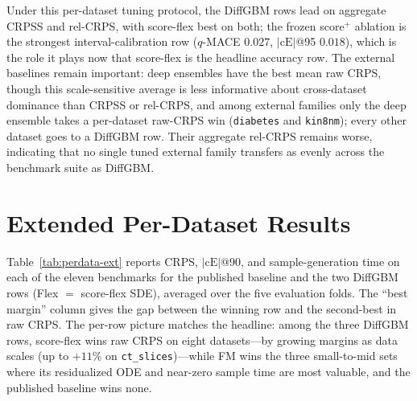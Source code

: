 \documentclass{article}
\begin{document}
Under this per-dataset tuning protocol, the DiffGBM rows lead on aggregate CRPSS and rel-CRPS, with score-flex best on both; the frozen score$^+$ ablation is the strongest interval-calibration row ($q$-MACE $0.027$, $|\text{cE}|$@95 $0.018$), which is the role it plays now that score-flex is the headline accuracy row. The external baselines remain important: deep ensembles have the best mean raw CRPS, though this scale-sensitive average is less informative about cross-dataset dominance than CRPSS or rel-CRPS, and among external families only the deep ensemble takes a per-dataset raw-CRPS win (\texttt{diabetes} and \texttt{kin8nm}); every other dataset goes to a DiffGBM row. Their aggregate rel-CRPS remains worse, indicating that no single tuned external family transfers as evenly across the benchmark suite as DiffGBM.

\section{Extended Per-Dataset Results}\label{app:perdata-ext}

Table~\ref{tab:perdata-ext} reports CRPS, $|\text{cE}|$@90, and sample-generation time on each of the eleven benchmarks for the published baseline and the two DiffGBM rows (Flex $=$ score-flex SDE), averaged over the five evaluation folds. The ``best margin'' column gives the gap between the winning row and the second-best in raw CRPS. The per-row picture matches the headline: among the three DiffGBM rows, score-flex wins raw CRPS on eight datasets---by growing margins as data scales (up to $+11\%$ on \texttt{ct\_slices})---while FM wins the three small-to-mid sets where its residualized ODE and near-zero sample time are most valuable, and the published baseline wins none.
\end{document}
